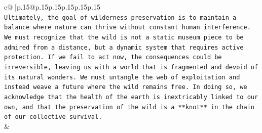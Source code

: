 \documentclass{article}
\begin{document}
{\begin{supertabular}{c@{$\;$}|p{.15\linewidth}@{}p{.15\linewidth}p{.15\linewidth}p{.15\linewidth}p{.15\linewidth}p{.15\linewidth}}
{{{\\ 
\texttt{Ultimately, the goal of wilderness preservation is to maintain a balance where nature can thrive without constant human interference. We must recognize that the wild is not a static museum piece to be admired from a distance, but a dynamic system that requires active protection. If we fail to act now, the consequences could be irreversible, leaving us with a world that is fragmented and devoid of its natural wonders. We must untangle the web of exploitation and instead weave a future where the wild remains free. In doing so, we acknowledge that the health of the earth is inextricably linked to our own, and that the preservation of the wild is a **knot** in the chain of our collective survival.} \\
            }
        }
    }
    & \\ \\


\end{supertabular}}
\end{document}
